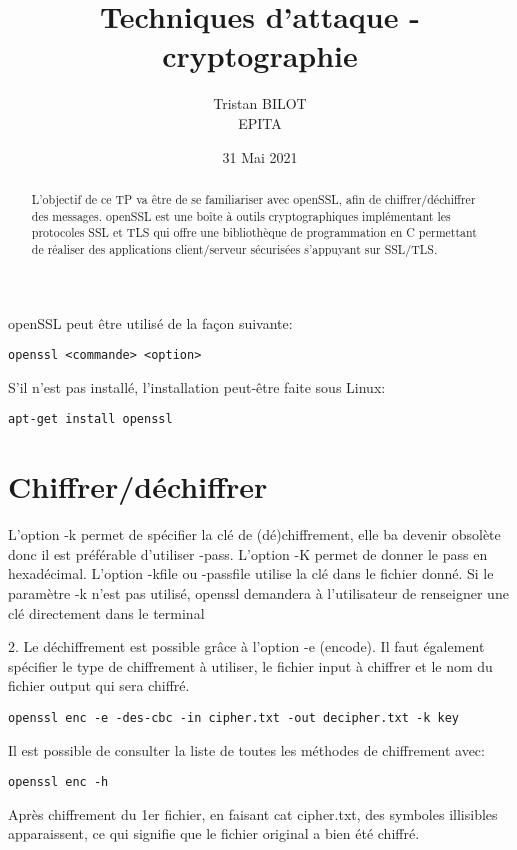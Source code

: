 \documentclass[12pt, oneside]{article}
\begin{document}
\title{Techniques d'attaque - cryptographie}
\author{Tristan BILOT\\EPITA}
\date{31 Mai 2021}
\maketitle

\begin{abstract}
L'objectif de ce TP va être de se familiariser avec openSSL, afin de chiffrer/déchiffrer des messages. openSSL est une boîte à outils cryptographiques implémentant les protocoles SSL et TLS qui offre une bibliothèque de programmation en C permettant de réaliser des applications client/serveur sécurisées s’appuyant sur SSL/TLS.
\end{abstract}
openSSL peut être utilisé de la façon suivante:
\begin{verbatim}
openssl <commande> <option>
\end{verbatim}
S'il n'est pas installé, l'installation peut-être faite sous Linux:
\begin{verbatim}
apt-get install openssl
\end{verbatim}

\section{Chiffrer/déchiffrer}
L'option -k permet de spécifier la clé de (dé)chiffrement, elle ba devenir obsolète donc il est préférable d'utiliser -pass. 
L'option -K permet de donner le pass en hexadécimal. 
L'option -kfile ou -passfile utilise la clé dans le fichier donné. 
Si le paramètre -k n'est pas utilisé, openssl demandera à l'utilisateur de renseigner une clé directement dans le terminal

2. Le déchiffrement est possible grâce à l'option -e (encode). Il faut également spécifier le type de chiffrement à utiliser, le fichier input à chiffrer et le nom du fichier output qui sera chiffré. 
\begin{verbatim}
openssl enc -e -des-cbc -in cipher.txt -out decipher.txt -k key
\end{verbatim}

Il est possible de consulter la liste de toutes les méthodes de chiffrement avec:
\begin{verbatim}
openssl enc -h
\end{verbatim}

Après chiffrement du 1er fichier, en faisant cat cipher.txt, des symboles illisibles apparaissent, ce qui signifie que le fichier original a bien été chiffré. \\
\end{document}
